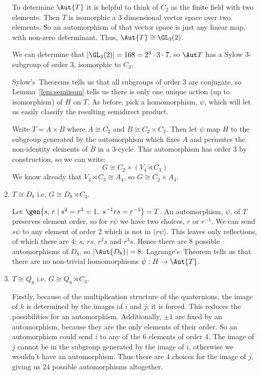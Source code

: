 \begin{enumerate}
        To determine \(\Aut{T}\) it is helpful to think of \(C_2\) as the finite field with two elements.
        Then \(T\) is isomorphic a 3 dimensional vector space over two elements.
        So an automorphism of that vector space is just any linear map, with non-zero determinant.
        Thus, \(\Aut{T} \cong \GL_3(2)\).

        We can determine that \(|\GL_3(2)| = 168 = 2^3 \cdot 3 \cdot 7\), so \(\Aut T\) has a Sylow 3-subgroup of order
        3, isomorphic to \(C_3\).

        Sylow's~Theorems tells us that all subgroups of order 3 are conjugate, so Lemma~\ref{lem:semiisom} tells us
        there is only one unique action (up to isomorphism) of \(H\) on \(T\).
        As before, pick a homomorphism, \(\psi\), which will let us easily classify the resulting semidirect product.

        Write \(T = A \times B\) where \(A \cong C_2\) and \(B \cong C_2 \times C_2\).
        Then let \(\psi\) map \(H\) to the subgroup generated by the automorphism which fixes \(A\) and permutes the
        non-identity elements of \(B\) in a 3-cycle.
        This automorphism has order 3 by construction, so we can write:
        \[G \cong C_2 \times (V_4 \rtimes C_3)\]
        We know already that \(V_4 \rtimes C_3 \cong A_4\), so \(G \cong C_2 \times A_4\).

    \item \(T \cong D_8\) i.e. \(G \cong D_8 \rtimes C_3\).

        Let \(\gen{s,\,r \mid s^2 = r^4 = 1,\ s^{-1}rs = r^{-1}} = T\).
        An automorphism, \(\psi\), of \(T\) preserves element order, so for \(r\psi\) we have two choices, \(r\) or
        \(r^{-1}\).
        We can send \(s\psi\) to any element of order 2 which is not in \(\langle r\psi \rangle\).
        This leaves only reflections, of which there are 4: \(s,\,rs,\,r^2s\) and \(r^3s\).
        Hence there are 8 possible automorphisms of \(D_8\), so \(|\Aut{D_8}| = 8\).
        Lagrange's~Theorem tells us that there are no non-trivial homomorphisms \(\psi:H \to \Aut{T}\).

    \item \(T \cong Q_8\) i.e. \(G \cong Q_8 \rtimes C_3\).

        Firstly, because of the multiplication structure of the quaternions, the image of \(k\) is determined by the
        images of \(i\) and \(j\); it is forced.
        This reduces the possibilities for an automorphism.
        Additionally, \(\pm 1\) are fixed by an automorphism, because they are the only elements of their order.
        So an automorphism could send \(i\) to any of the 6 elements of order 4.
        The image of \(j\) cannot be in the subgroup generated by the image of \(i\), otherwise we wouldn't have an
        automorphism.
        Thus there are 4 choices for the image of \(j\), giving us 24 possible automorphisms altogether.


\end{enumerate}
